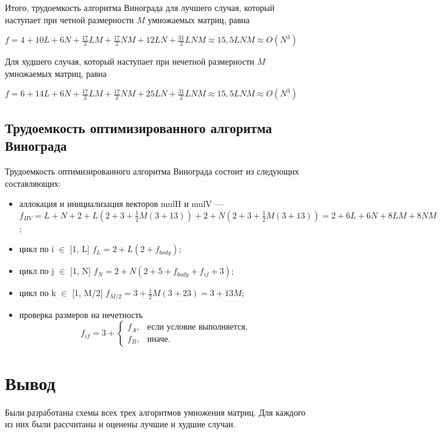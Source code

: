 Итого, трудоемкость алгоритма Винограда для лучшего случая, который наступает при четной размерности $M$ умножаемых матриц, равна

$ f = 4 + 10L + 6N + \frac{17}{2}LM + \frac{17}{2}NM + 12LN + \frac{31}{2}LNM \approx 15,5LNM \approx O(N^3) $

Для худшего случая, который наступает при нечетной размерности $M$ умножаемых матриц, равна

$f = 6 + 14L + 6N + \frac{17}{2}LM + \frac{17}{2}NM + 25LN + \frac{31}{2}LNM \approx 15,5LNM \approx O(N^3) $

\subsection{Трудоемкость оптимизированного алгоритма Винограда}

Трудоемкость оптимизированного алгоритма Винограда состоит из следующих составляющих:
\begin{itemize}
	\item аллокация и инициализация векторов mulH и mulV --- $f_{HV} = L + N + 2 + L(2 + 3 + \frac{1}{2}M(3 + 13)) + 2 + N(2 + 3 + \frac{1}{2}M(3 + 13)) = 2 + 6L + 6N + 8LM + 8NM$;
	\item цикл по i $\in$ [1, L] $f_{L} = 2 + L(2 + f_{body})$;
	\item цикл по j $\in$ [1, N] $f_{N} = 2 + N(2 + 5 + f_{body} + f_{if} + 3)$;
	\item цикл по k $\in$ [1, M/2] $f_{M/2} = 3 + \frac{1}{2}M(3 + 23) = 3 + 13M$;
	\item проверка размеров на нечетность
	\begin{equation}
		f_{if} = 3 + 
		\begin{cases}
			f_A, & \text{если условие выполняется,}\\
			f_B, & \text{иначе.}
		\end{cases}
	\end{equation}
\end{itemize} 



\section*{Вывод}

Были разработаны схемы всех трех алгоритмов умножения матриц. Для каждого из них были рассчитаны и оценены лучшие и худшие случаи.


